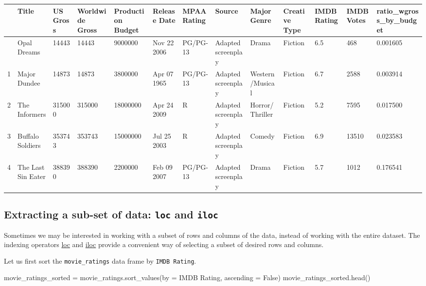 \documentclass[
  letterpaper,
  DIV=11,
  numbers=noendperiod]{scrreprt}
\newenvironment{Shaded}{\begin{snugshade}}{\end{snugshade}}
\newcommand{\NormalTok}[1]{\textcolor[rgb]{0.00,0.23,0.31}{#1}}
\newcommand{\OperatorTok}[1]{\textcolor[rgb]{0.37,0.37,0.37}{#1}}
\newcommand{\StringTok}[1]{\textcolor[rgb]{0.13,0.47,0.30}{#1}}
\newcommand{\VariableTok}[1]{\textcolor[rgb]{0.07,0.07,0.07}{#1}}
\begin{document}
\begin{longtable}[]{@{}lllllllllllll@{}}
\toprule\noalign{}
& Title & US Gross & Worldwide Gross & Production Budget & Release Date
& MPAA Rating & Source & Major Genre & Creative Type & IMDB Rating &
IMDB Votes & ratio\_wgross\_by\_budget \\
\midrule\noalign{}
\endhead
\bottomrule\noalign{}
\endlastfoot
0 & Opal Dreams & 14443 & 14443 & 9000000 & Nov 22 2006 & PG/PG-13 &
Adapted screenplay & Drama & Fiction & 6.5 & 468 & 0.001605 \\
1 & Major Dundee & 14873 & 14873 & 3800000 & Apr 07 1965 & PG/PG-13 &
Adapted screenplay & Western/Musical & Fiction & 6.7 & 2588 &
0.003914 \\
2 & The Informers & 315000 & 315000 & 18000000 & Apr 24 2009 & R &
Adapted screenplay & Horror/Thriller & Fiction & 5.2 & 7595 &
0.017500 \\
3 & Buffalo Soldiers & 353743 & 353743 & 15000000 & Jul 25 2003 & R &
Adapted screenplay & Comedy & Fiction & 6.9 & 13510 & 0.023583 \\
4 & The Last Sin Eater & 388390 & 388390 & 2200000 & Feb 09 2007 &
PG/PG-13 & Adapted screenplay & Drama & Fiction & 5.7 & 1012 &
0.176541 \\
\end{longtable}

\hypertarget{extracting-a-sub-set-of-data-loc-and-iloc}{%
\subsection{\texorpdfstring{Extracting a sub-set of data: \texttt{loc}
and
\texttt{iloc}}{Extracting a sub-set of data: loc and iloc}}\label{extracting-a-sub-set-of-data-loc-and-iloc}}

Sometimes we may be interested in working with a subset of rows and
columns of the data, instead of working with the entire dataset. The
indexing operators
\href{https://pandas.pydata.org/docs/reference/api/pandas.DataFrame.loc.html}{loc}
and
\href{https://pandas.pydata.org/docs/reference/api/pandas.DataFrame.iloc.html}{iloc}
provide a convenient way of selecting a subset of desired rows and
columns.

Let us first sort the \texttt{movie\_ratings} data frame by
\texttt{IMDB\ Rating}.

\begin{Shaded}
\begin{Highlighting}[]
\NormalTok{movie\_ratings\_sorted }\OperatorTok{=}\NormalTok{ movie\_ratings.sort\_values(by }\OperatorTok{=} \StringTok{\textquotesingle{}IMDB Rating\textquotesingle{}}\NormalTok{, ascending }\OperatorTok{=} \VariableTok{False}\NormalTok{)}
\NormalTok{movie\_ratings\_sorted.head()}
\end{Highlighting}
\end{Shaded}
\end{document}
